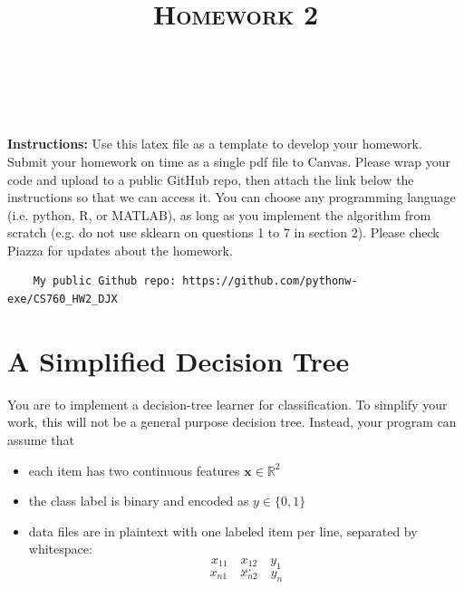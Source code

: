 \documentclass[a4paper]{article}
\title{\textsc{Homework 2}} %
\author{
\red{$>>$Jingxin Du$<<$} \\
\red{$>>$jdu86$<<$}\\
}
\date{}
\theoremstyle{definition}
\newcommand{\RR}{\mathbb{R}}
\def\x{\mathbf x}
\begin{document}
\maketitle 


\textbf{Instructions:} 
Use this latex file as a template to develop your homework. Submit your homework on time as a single pdf file to Canvas. Please wrap your code and upload to a public GitHub repo, then attach the link below the instructions so that we can access it. You can choose any programming language (i.e. python, R, or MATLAB), as long as you implement the algorithm from scratch (e.g. do not use sklearn on questions 1 to 7 in section 2). Please check Piazza for updates about the homework.
{\color{blue}
\begin{verbatim}
    My public Github repo: https://github.com/pythonw-exe/CS760_HW2_DJX
\end{verbatim}
}
\section{A Simplified Decision Tree}
You are to implement a decision-tree learner for classification.
To simplify your work, this will not be a general purpose decision tree.  Instead, your program can assume that
\begin{itemize}
\item each item has two continuous features $\x \in \RR^2$
\item the class label is binary and encoded as $y \in \{0,1\}$
\item data files are in plaintext with one labeled item per line, separated by whitespace:
$$x_{11} \quad x_{12} \quad y_1$$
$$...$$
$$x_{n1} \quad x_{n2} \quad y_n$$
\end{itemize}
\end{document}
